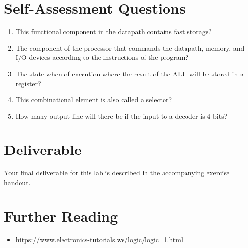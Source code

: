 \documentclass[a4paper, 11pt,oneside]{article}
\begin{document}
\section{Self-Assessment Questions}
\begin{enumerate}
\item This functional component in the datapath contains fast storage?
\item The component of the processor that commands the datapath, memory, and 
I/O devices according to the instructions of the program? 
\item The state when of execution where the result of the ALU will be stored 
in a register?
\item This combinational element is also called a selector?
\item How many output line will there be if the input to a decoder is 4 bits?
\end{enumerate}

\section{Deliverable}
Your final deliverable for this lab is described in the accompanying exercise handout.

\section{Further Reading}
\begin{itemize}
\item 
\href{https://www.electronics-tutorials.ws/logic/logic\_1.html}
{https://www.electronics-tutorials.ws/logic/logic\_1.html}
\end{itemize}




\nocite{*}
\end{document}
